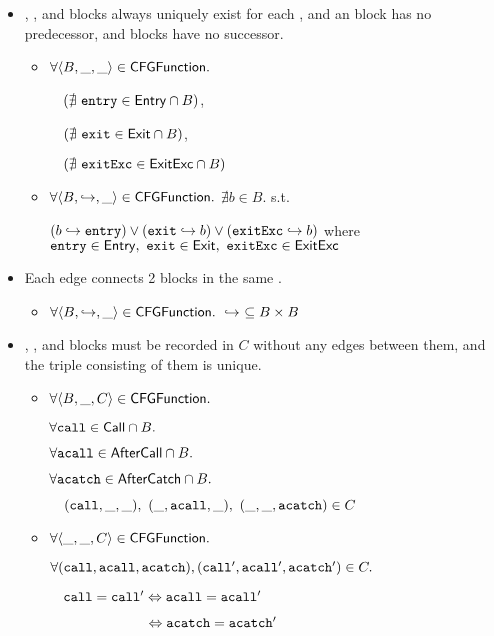\begin{itemize}
\item \Entry, \Exit, and \ExitExc blocks always uniquely exist for each \CFGFunction,
and an \Entry block has no predecessor, \Exit and \ExitExc blocks have no successor.
\begin{itemize}
\item $\forall \langle B, \_, \_ \rangle \in \mbox{\textsf{CFGFunction}}.$

$\quad(\nexists\ \mbox{\texttt{entry}} \in\mbox{\textsf{Entry}}\cap B)$,

$\quad(\nexists\ \mbox{\texttt{exit}} \in \mbox{\textsf{Exit}} \cap B)$,

$\quad(\nexists\ \mbox{\texttt{exitExc}} \in \mbox{\textsf{ExitExc}} \cap B)$
\item $\forall \langle B, \hookrightarrow, \_ \rangle \in \mbox{\textsf{CFGFunction}}.$
$\nexists b \in B.$ s.t.

$(b \hookrightarrow \mbox{\texttt{entry}}) \vee (\mbox{\texttt{exit}} \hookrightarrow b) \vee (\mbox{\texttt{exitExc}} \hookrightarrow b)$
where $\mbox{\texttt{entry}} \in \mbox{\textsf{Entry}},\ \mbox{\texttt{exit}} \in \mbox{\textsf{Exit}},\ \mbox{\texttt{exitExc}} \in \mbox{\textsf{ExitExc}}$
\end{itemize}

\item Each edge connects 2 blocks in the same \CFGFunction.
\begin{itemize}
\item $\forall \langle B, \hookrightarrow, \_ \rangle \in \mbox{\textsf{CFGFunction}}.\ \hookrightarrow\ \subseteq B \times B$
\end{itemize}

\item \Call, \AfterCall, and \AfterCatch blocks must be recorded in $C$ without any edges
between them, and the triple consisting of them is unique.
\begin{itemize}
\item $\forall \langle B, \_, C \rangle \in \mbox{\textsf{CFGFunction}}.$

$\forall \call \in \Call \cap B.\ $

$\forall \acall \in \AfterCall \cap B.\ $

$\forall \acatch \in \AfterCatch \cap B.\ $

$\quad(\call, \_, \_),\ (\_, \acall, \_),\ (\_, \_, \acatch) \in C$
\item $\forall \langle \_, \_, C \rangle \in \mbox{\textsf{CFGFunction}}.$

\mbox{$\forall (\mbox{\texttt{call}}, \mbox{\texttt{acall}}, \mbox{\texttt{acatch}}), (\mbox{\texttt{call}}', \mbox{\texttt{acall}}', \mbox{\texttt{acatch}}') \in C.$}

$\quad\mbox{\texttt{call}} = \mbox{\texttt{call}}' \Leftrightarrow \mbox{\texttt{acall}} = \mbox{\texttt{acall}}'$

$\phantom{\quad\call = \call' }\Leftrightarrow \acatch = \acatch'$
\end{itemize}


\end{itemize}
